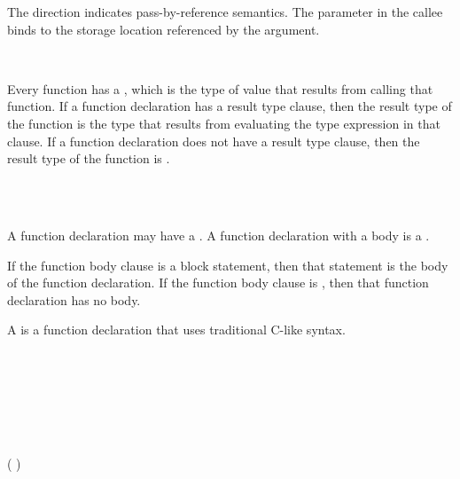 
The  direction indicates pass-by-reference semantics.
The parameter in the callee binds to the storage location referenced by the argument.


\begin{Syntax}
     \\
        \code{->} 
\end{Syntax}

Every function has a , which is the type of value that results from calling that function.
If a function declaration has a result type clause, then the result type of the function is the type that results from evaluating the type expression in that clause.
If a function declaration does not have a result type clause, then the result type of the function is .


\begin{Syntax}
     \\
         \\
        \SynOr \code{;}
\end{Syntax}

A function declaration may have a .
A function declaration with a body is a .

If the function body clause is a block statement, then that statement is the body of the function declaration.
If the function body clause is \code{;}, then that function declaration has no body.

\begin{Legacy}

A  is a function declaration that uses traditional C-like syntax.

\begin{Syntax}
     \\
          \\
        \SynOpt \\
        \SynOpt \\
         \\

     \\
        \code{(} ( \code{,}) \SynStar \code{)}

     \\
           \SynOpt \\
\end{Syntax}

\end{Legacy}

